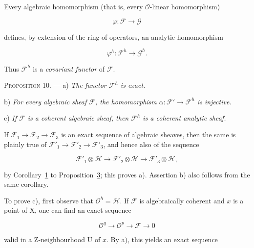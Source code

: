 Every algebraic homomorphism (that is, every $\mathcal{O}$-linear homomorphism)

\begin{equation*}
\varphi:\mathcal{F}\longrightarrow\mathcal{G}
\end{equation*}

defines, by extension of the ring of operators, an analytic homomorphism

\begin{equation*}
\varphi^h:\mathcal{F}^h\longrightarrow\mathcal{G}^h.
\end{equation*}

Thus $\mathcal{F}^h$ is a \emph{covariant functor} of $\mathcal{F}$.

\textsc{Proposition 10}. --- a) \emph{The functor $\mathcal{F}^h$ is exact.}

b) \emph{For every algebraic sheaf $\mathcal{F}$, the homomorphism $\alpha:\mathcal{F}'\to\mathcal{F}^h$ is injective.}

c) \emph{If $\mathcal{F}$ is a coherent algebraic sheaf, then $\mathcal{F}^h$ is a coherent analytic sheaf.}

If $\mathcal{F}_1\to\mathcal{F}_2\to\mathcal{F}_3$ is an exact sequence of algebraic sheaves, then the same is plainly true of $\mathcal{F}'_1\to\mathcal{F}'_2\to\mathcal{F}'_3$, and hence also of the sequence

\begin{equation*}
\mathcal{F}'_1\otimes\mathcal{H}\longrightarrow
\mathcal{F}'_2\otimes\mathcal{H}\longrightarrow
\mathcal{F}'_3\otimes\mathcal{H},
\end{equation*}

by Corollary~\hyperref[gaga:cor:1]{1} to Proposition~\hyperref[gaga:prop:3]{3}; this proves a). Assertion b) also follows from the same corollary.

To prove c), first observe that $\mathcal{O}^h=\mathcal{H}$. If $\mathcal{F}$ is algebraically coherent and $x$ is a point of $\mathrm{X}$, one can find an exact sequence

\begin{equation*}
\mathcal{O}^q\longrightarrow\mathcal{O}^p\longrightarrow\mathcal{F}\longrightarrow0
\end{equation*}

valid in a Z-neighbourhood $\mathrm{U}$ of $x$. By a), this yields an exact sequence

